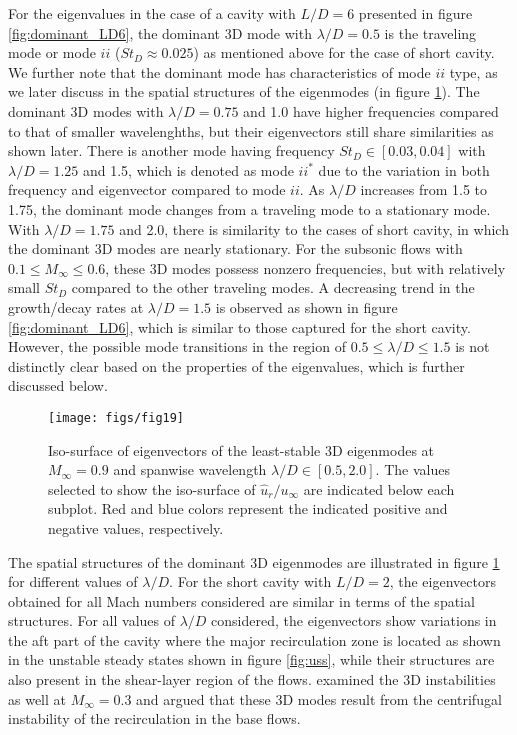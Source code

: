 \documentclass{jfm}
\begin{document}
For the eigenvalues in the case of a cavity with $L/D=6$ presented in figure \ref{fig:dominant_LD6}, the dominant 3D mode with $\lambda/D=0.5$ is the traveling mode or mode $ii$ ($St_D\approx0.025$) as mentioned above for the case of short cavity. We further note that the dominant mode has characteristics of mode $ii$ type, as we later discuss in the spatial structures of the eigenmodes (in figure \ref{fig:3Dviews}). The dominant 3D modes with $\lambda/D=0.75$ and 1.0 have higher frequencies compared to that of smaller wavelenghths, but their eigenvectors still share similarities as shown later. There is another mode having frequency $St_D\in[0.03,0.04]$ with $\lambda/D=1.25$ and 1.5, which is denoted as mode $ii^*$ due to the variation in both frequency and eigenvector compared to mode $ii$. As $\lambda/D$ increases from 1.5 to 1.75, the dominant mode changes from a traveling mode to a stationary mode. With $\lambda/D=1.75$ and 2.0, there is similarity to the cases of short cavity, in which the dominant 3D modes are nearly stationary. For the subsonic flows with $0.1\le M_\infty \le0.6$, these 3D modes possess nonzero frequencies, but with relatively small $St_D$ compared to the other traveling modes. A decreasing trend in the growth/decay rates at $\lambda/D=1.5$ is observed as shown in figure \ref{fig:dominant_LD6}, which is similar to those captured for the short cavity.  However, the possible mode transitions in the region of $0.5\le \lambda/D \le1.5$ is not distinctly clear based on the properties of the eigenvalues, which is further discussed below.  

\begin{figure}
\begin{center}
   \texttt{[image: figs/fig19]}
\end{center}
\caption{Iso-surface of eigenvectors of the least-stable 3D eigenmodes at $M_\infty=0.9$ and spanwise wavelength $\lambda/D\in[0.5,2.0]$. The values selected to show the iso-surface of $\hat u_r/u_\infty$ are indicated below each subplot. Red and blue colors represent the indicated positive and negative values, respectively.}
\label{fig:3Dviews}
\end{figure}

The spatial structures of the dominant 3D eigenmodes are illustrated in figure \ref{fig:3Dviews} for different values of $\lambda/D$. For the short cavity with $L/D=2$, the eigenvectors obtained for all Mach numbers considered are similar in terms of the spatial structures. For all values of $\lambda/D$ considered, the eigenvectors show variations in the aft part of the cavity where the major recirculation zone is located as shown in the unstable steady states shown in figure \ref{fig:uss}, while their structures are also present in the shear-layer region of the flows. \cite{Bres:JFM08} examined the 3D instabilities as well at $M_\infty=0.3$ and argued that these 3D modes result from the centrifugal instability of the recirculation in the base flows. 
\end{document}
